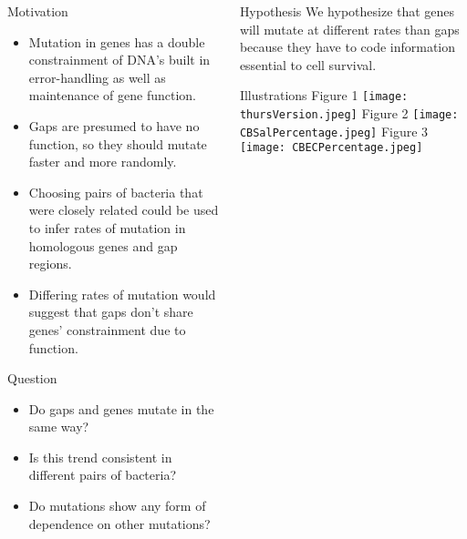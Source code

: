 \documentclass[final]{beamer}
\begin{document}
\begin{frame}{}
\begin{columns}[t]
\begin{column}{.32 \linewidth}
			\begin{block}{\large Motivation}
				
				\begin{itemize}
					
					\item Mutation in genes has a double constrainment of DNA's built in error-handling as well as maintenance of gene function. 
					
					\item Gaps are presumed to have no function, so they should mutate faster and more randomly.  
					
					\item Choosing pairs of bacteria that were closely related could be used to infer rates of mutation in homologous genes and gap regions. 
					
					\item Differing rates of mutation would suggest that gaps don't share genes' constrainment due to function.
				\end{itemize}
			\end{block}
			
			\begin{block}{\large Question}
				\begin{itemize}
					\item Do gaps and genes mutate in the same way?
					\item Is this trend consistent in different pairs of bacteria?
					\item Do mutations show any form of dependence on other mutations?
				\end{itemize} 
			\end{block}
			
			
			
		\end{column}
		
		
		\begin{column}{.32 \linewidth}
			\begin{block}{\large Hypothesis}
				We hypothesize that genes will mutate at different rates than gaps because they have to code information essential to cell survival.
				
			\end{block}
			\begin{block}{\large Illustrations}
				Figure 1
				\newline
				\texttt{[image: thursVersion.jpeg]}
				\newline
				Figure 2
				\texttt{[image: CBSalPercentage.jpeg]}
				\newline
				Figure 3
				\texttt{[image: CBECPercentage.jpeg]}
				

\end{block}
\end{column}
\end{columns}
\end{frame}
\end{document}
